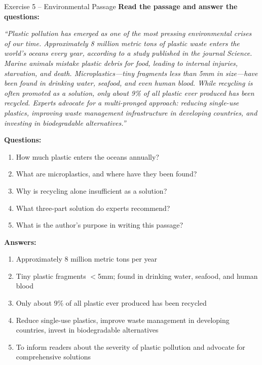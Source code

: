 \documentclass[12pt,a4paper]{article}
\begin{document}
\begin{practicebox}{Exercise 5 -- Environmental Passage}
\textbf{Read the passage and answer the questions:}

\textit{``Plastic pollution has emerged as one of the most pressing environmental crises of our time. Approximately 8 million metric tons of plastic waste enters the world's oceans every year, according to a study published in the journal Science. Marine animals mistake plastic debris for food, leading to internal injuries, starvation, and death. Microplastics---tiny fragments less than 5mm in size---have been found in drinking water, seafood, and even human blood. While recycling is often promoted as a solution, only about 9\% of all plastic ever produced has been recycled. Experts advocate for a multi-pronged approach: reducing single-use plastics, improving waste management infrastructure in developing countries, and investing in biodegradable alternatives.''}

\textbf{Questions:}
\begin{enumerate}[noitemsep]
    \item How much plastic enters the oceans annually?
    \item What are microplastics, and where have they been found?
    \item Why is recycling alone insufficient as a solution?
    \item What three-part solution do experts recommend?
    \item What is the author's purpose in writing this passage?
\end{enumerate}

\textbf{Answers:}
\begin{enumerate}[noitemsep]
    \item Approximately 8 million metric tons per year
    \item Tiny plastic fragments $<$5mm; found in drinking water, seafood, and human blood
    \item Only about 9\% of all plastic ever produced has been recycled
    \item Reduce single-use plastics, improve waste management in developing countries, invest in biodegradable alternatives
    \item To inform readers about the severity of plastic pollution and advocate for comprehensive solutions
\end{enumerate}
\end{practicebox}

\newpage
\end{document}
